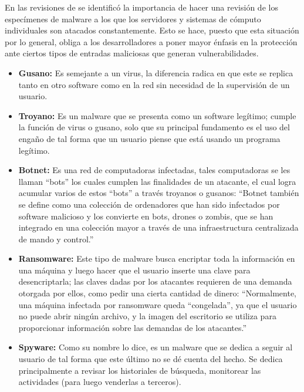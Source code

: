 En las revisiones de \textcite{Mosquera2019} se identificó la importancia de
hacer una revisión de los especímenes de malware a los que los servidores y
sistemas de cómputo individuales son atacados constantemente. Esto se hace,
puesto que esta situación por lo general, obliga a los desarrolladores a poner
mayor énfasis en la protección ante ciertos tipos de entradas maliciosas que
generan vulnerabilidades.

\begin{itemize}
  \item \textbf{Gusano:}
    Es semejante a un virus, la diferencia radica en que este se replica tanto
    en otro software como en la red sin necesidad de la supervisión de un
    usuario. \parencite{Rosli2019}

  \item \textbf{Troyano:}
    Es un malware que se presenta como un software legítimo; cumple la función
    de virus o gusano, solo que su principal fundamento es el uso del engaño de
    tal forma que un usuario piense que está usando un programa legítimo.
    \parencite{Rosli2019}

  \item \textbf{Botnet:}
    Es una red de computadoras infectadas, tales computadoras se les llaman
    ``bots'' los cuales cumplen las finalidades de un atacante, el cual logra
    acumular varios de estos ``bots'' a través troyanos o gusanos: ``Botnet
    también se define como una colección de ordenadores que han sido infectados
    por software malicioso y los convierte en bots, drones o zombis, que se han
    integrado en una colección mayor a través de una infraestructura
    centralizada de mando y control.'' \parencite{Rosli2019}

  \item \textbf{Ransomware:}
    Este tipo de malware busca encriptar toda la información en una máquina y
    luego hacer que el usuario inserte una clave para desencriptarla; las claves
    dadas por los atacantes requieren de una demanda otorgada por ellos, como
    pedir una cierta cantidad de dinero: ``Normalmente, una máquina infectada
    por ransomware queda ``congelada'', ya que el usuario no puede abrir ningún
    archivo, y la imagen del escritorio se utiliza para proporcionar información
    sobre las demandas de los atacantes.'' \parencite{Rosli2019}

  \item \textbf{Spyware:}
    Como su nombre lo dice, es un malware que se dedica a seguir al usuario de
    tal forma que este último no se dé cuenta del hecho. Se dedica
    principalmente a revisar los historiales de búsqueda, monitorear las
    actividades (para luego venderlas a terceros).
    \parencite{Rosli2019}
\end{itemize}

